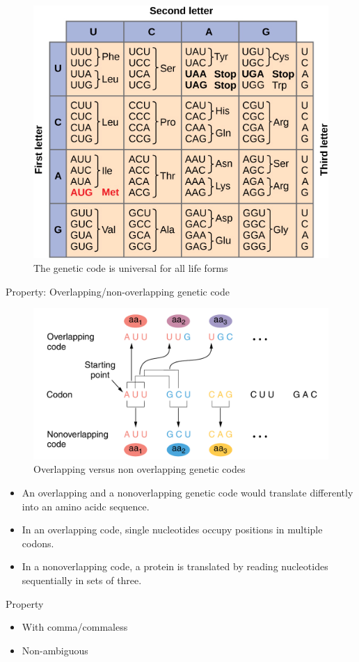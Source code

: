\documentclass[11pt,dvipsnames,ignorenonframetext,aspectratio=169]{beamer}
\providecommand{\tightlist}{%
  \setlength{\itemsep}{0pt}\setlength{\parskip}{0pt}}
\begin{document}
\begin{frame}{}
\protect\hypertarget{section-3}{}
\begin{figure}
\includegraphics[width=0.45\linewidth]{./../images/nucleotide_codons} \caption{The genetic code is universal for all life forms}\label{fig:universality}
\end{figure}
\end{frame}

\begin{frame}{Property: Overlapping/non-overlapping genetic code}
\protect\hypertarget{property-overlappingnon-overlapping-genetic-code}{}
\begin{figure}
\includegraphics[width=0.4\linewidth]{./../images/overlap_non_overlap} \caption{Overlapping versus non overlapping genetic codes}\label{fig:overlap-n-non}
\end{figure}

\begin{itemize}
\tightlist
\item
  An overlapping and a nonoverlapping genetic code would translate
  differently into an amino acidc sequence.
\item
  In an overlapping code, single nucleotides occupy positions in
  multiple codons.
\item
  In a nonoverlapping code, a protein is translated by reading
  nucleotides sequentially in sets of three.
\end{itemize}
\end{frame}

\begin{frame}{Property}
\protect\hypertarget{property}{}
\begin{itemize}
\tightlist
\item
  With comma/commaless
\item
  Non-ambiguous
\end{itemize}
\end{frame}
\end{document}
